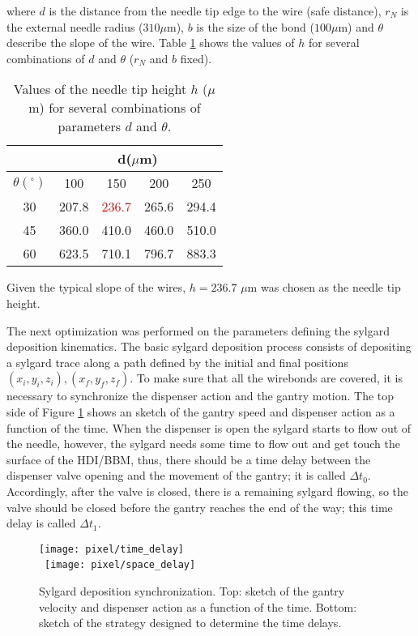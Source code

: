 \noindent where $d$ is the distance from the needle tip edge to the wire (safe distance), $r_N$ is the external needle radius ($310 \mu$m), $b$ is the size of the bond ($100 \mu$m) and $\theta$ describe the slope of the wire. Table \ref{tab:needle_tip_heights} shows the values of $h$ for several combinations of $d$ and $\theta$ ($r_N$ and $b$ fixed).
\begin{table}
  \centering
  \begin{tabular}{ c  c  c  c  c } \hline
               &\multicolumn{4}{c}{d($\mu$m)}\\\hline
  $\theta(^\circ)$ & 100   & 150   & 200   & 250 \\\hline
    30         & 207.8 & \textcolor{red}{236.7} & 265.6 & 294.4 \\
    45         & 360.0 & 410.0 & 460.0 & 510.0 \\
    60         & 623.5 & 710.1 & 796.7 & 883.3 \\\hline
  \end{tabular}
  \caption[Values of the needle tip height $h$]{Values of the needle tip height $h$ ($\mu$m) for several combinations of parameters $d$ and $\theta$. }\label{tab:needle_tip_heights}
\end{table}

Given the typical slope of the wires, $h=236.7$ $\mu$m was chosen as the needle tip height.   

The next optimization was performed on the parameters defining the sylgard deposition kinematics. The basic sylgard deposition process consists of depositing a sylgard trace along a path defined by the initial and final positions $(x_i, y_i, z_i), (x_f, y_f, z_f)$. To make sure that all the wirebonds are covered, it is necessary to synchronize the dispenser action and the gantry motion. The top side of Figure \ref{fig:sylgard_synch} shows an sketch of the gantry speed and dispenser action as a function of the time. When the dispenser is open the sylgard starts to flow out of the needle, however, the sylgard needs some time to flow out and get touch the surface of the HDI/BBM, thus, there should be a time delay between the dispenser valve opening and the movement of the gantry; it is called $\Delta t_0$. Accordingly, after the valve is closed, there is a remaining sylgard flowing, so the valve should be closed before the gantry reaches the end of the way; this time delay is called $\Delta t_1$.

\begin{figure}[h]
  \begin{center}
    \texttt{[image: pixel/time\_delay]}\\\ 
    \texttt{[image: pixel/space\_delay]}
    \caption[Sylgard deposition synchronization.]{Sylgard deposition synchronization. Top: sketch of the gantry velocity and dispenser action as a function of the time. Bottom: sketch of the strategy designed to determine the time delays.}\label{fig:sylgard_synch}
  \end{center}
\end{figure}

